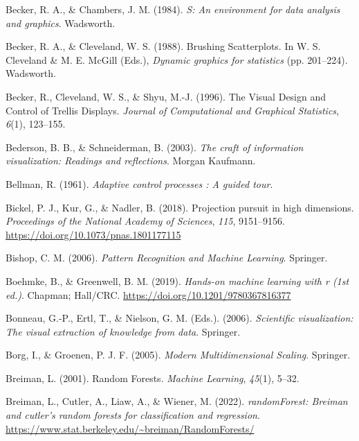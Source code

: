 \documentclass[
  letterpaper,
]{krantz}
\newlength{\cslhangindent}
\newenvironment{CSLReferences}[2] %
 {\begin{list}{}{%
  \setlength{\itemindent}{0pt}
  \setlength{\leftmargin}{0pt}
  \setlength{\parsep}{0pt}
  \ifodd #1
   \setlength{\leftmargin}{\cslhangindent}
   \setlength{\itemindent}{-1\cslhangindent}
  \fi
  \setlength{\itemsep}{#2\baselineskip}}}
 {\end{list}}
\begin{document}
\begin{CSLReferences}{1}{0}
Becker, R. A., \& Chambers, J. M. (1984). \emph{{S}: An environment for
data analysis and graphics}. Wadsworth.

Becker, R. A., \& Cleveland, W. S. (1988). {B}rushing {S}catterplots. In
W. S. Cleveland \& M. E. McGill (Eds.), \emph{Dynamic graphics for
statistics} (pp. 201--224). Wadsworth.

Becker, R., Cleveland, W. S., \& Shyu, M.-J. (1996). {T}he {V}isual
{D}esign and {C}ontrol of {T}rellis {D}isplays. \emph{Journal of
Computational and Graphical Statistics}, \emph{6}(1), 123--155.

Bederson, B. B., \& Schneiderman, B. (2003). \emph{The craft of
information visualization: Readings and reflections}. Morgan Kaufmann.

Bellman, R. (1961). \emph{Adaptive control processes : A guided tour}.

Bickel, P. J., Kur, G., \& Nadler, B. (2018). Projection pursuit in high
dimensions. \emph{Proceedings of the National Academy of Sciences},
\emph{115}, 9151--9156. \url{https://doi.org/10.1073/pnas.1801177115}

Bishop, C. M. (2006). \emph{Pattern {R}ecognition and {M}achine
{L}earning}. Springer.

Boehmke, B., \& Greenwell, B. M. (2019). \emph{Hands-on machine learning
with r (1st ed.)}. Chapman; Hall/CRC.
\url{https://doi.org/10.1201/9780367816377}

Bonneau, G.-P., Ertl, T., \& Nielson, G. M. (Eds.). (2006).
\emph{Scientific visualization: The visual extraction of knowledge from
data}. Springer.

Borg, I., \& Groenen, P. J. F. (2005). \emph{Modern {M}ultidimensional
{S}caling}. Springer.

Breiman, L. (2001). Random {F}orests. \emph{Machine Learning},
\emph{45}(1), 5--32.

Breiman, L., Cutler, A., Liaw, A., \& Wiener, M. (2022).
\emph{randomForest: Breiman and cutler's random forests for
classification and regression}.
\url{https://www.stat.berkeley.edu/~breiman/RandomForests/}


\end{CSLReferences}
\end{document}
